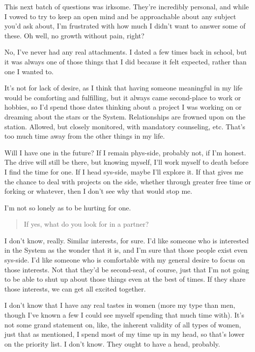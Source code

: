 \noindent This next batch of questions was irksome. They're incredibly personal, and while I vowed to try to keep an open mind and be approachable about any subject you'd ask about, I'm frustrated with how much I didn't want to answer some of these. Oh well, no growth without pain, right?

No, I've never had any real attachments. I dated a few times back in school, but it was always one of those things that I did because it felt expected, rather than one I wanted to.

It's not for lack of desire, as I think that having someone meaningful in my life would be comforting and fulfilling, but it always came second-place to work or hobbies, so I'd spend those dates thinking about a project I was working on or dreaming about the stars or the System. Relationships are frowned upon on the station. Allowed, but closely monitored, with mandatory counseling, etc. That's too much time away from the other things in my life.

Will I have one in the future? If I remain phys-side, probably not, if I'm honest. The drive will still be there, but knowing myself, I'll work myself to death before I find the time for one. If I head sys-side, maybe I'll explore it. If that gives me the chance to deal with projects on the side, whether through greater free time or forking or whatever, then I don't see why that would stop me.

I'm not so lonely as to be hurting for one.

\begin{quote}
If yes, what do you look for in a partner?
\end{quote}

\noindent I don't know, really. Similar interests, for sure. I'd like someone who is interested in the System as the wonder that it is, and I'm sure that those people exist even sys-side. I'd like someone who is comfortable with my general desire to focus on those interests. Not that they'd be second-seat, of course, just that I'm not going to be able to shut up about those things even at the best of times. If they share those interests, we can get all excited together.

I don't know that I have any real tastes in women (more my type than men, though I've known a few I could see myself spending that much time with). It's not some grand statement on, like, the inherent validity of all types of women, just that as mentioned, I spend most of my time up in my head, so that's lower on the priority list. I don't know. They ought to have a head, probably.

